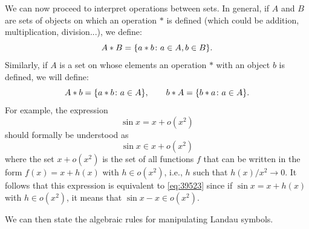 We can now proceed to interpret operations between sets. In general, if $A$ and
$B$ are sets of objects on which an operation $*$ is defined (which could be
addition, multiplication, division...), we define:
\[
  A * B = {\left\{ a*b \colon a \in A, b\in B \right\}}.
\]
Similarly, if $A$ is a set on whose elements an operation $*$ with an object $b$
is defined, we will define:
\[
  A * b = {\left\{ a*b\colon a \in A \right\}}, \qquad
  b * A = {\left\{ b*a\colon a \in A \right\}}.
\]
For example, the expression
\[
  \sin x = x + o(x^2)
\]
should formally be understood as
\[
  \sin x  \in x + o(x^2)
\]
where the set $x+ o(x^2)$ is the set of all functions
$f$ that can be written in the form $f(x) = x+h(x)$ with $h\in o(x^2)$, i.e.,
$h$ such that $h(x)/x^2 \to 0$. It follows that this expression is equivalent to
\eqref{eq:39523} since if $\sin x = x + h(x)$ with $h\in o(x^2)$, it means that
$\sin x- x \in o(x^2)$.

We can then state the algebraic rules for manipulating Landau symbols.

